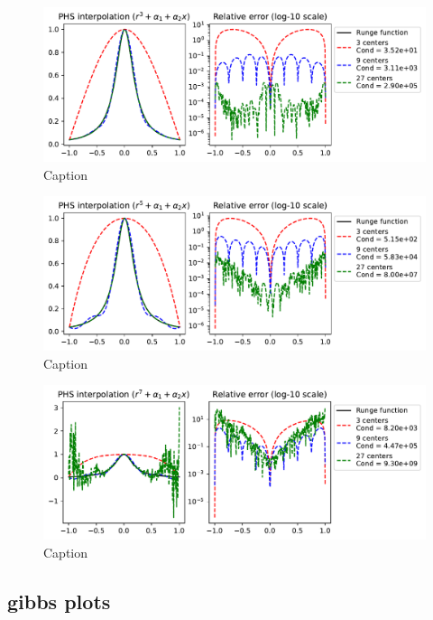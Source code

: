 \documentclass[12pt]{report} %
\begin{document}
\begin{figure}[ht]
    \centering
    \includegraphics[width=\textwidth]{imagenes/phs_interpolation/runge_phs_r3_deg1.pdf}
    \caption{Caption}
    \label{fig:phs-runge-phenomenon-deg-3}
\end{figure}

\begin{figure}[ht]
    \centering
    \includegraphics[width=\textwidth]{imagenes/phs_interpolation/runge_phs_r5_deg1.pdf}
    \caption{Caption}
    \label{fig:phs-runge-phenomenon-deg-5}
\end{figure}

\begin{figure}[ht]
    \centering
    \includegraphics[width=\textwidth]{imagenes/phs_interpolation/runge_phs_r7_deg1.pdf}
    \caption{Caption}
    \label{fig:phs-runge-phenomenon-deg-7}
\end{figure}

\subsection{gibbs plots}
\end{document}
